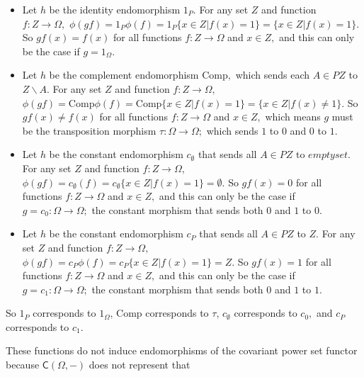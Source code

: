 \documentclass[main.tex]{subfiles}
\begin{document}
	\begin{itemize}
		\item Let $ h $ be the identity endomorphism $ 1_P $. For any
			set $ Z $ and function $ f: Z \to \Omega, $ $ \phi(gf)
			= 1_P\phi(f) = 1_P\{x \in Z | f(x) = 1\} = \{x \in Z |
			f(x) = 1\}. $ So $ gf(x) = f(x) $ for all functions $
			f: Z \to \Omega $ and $ x \in Z, $ and this can only be
			the case if $ g = 1_\Omega. $
		\item Let $ h $ be the complement endomorphism $ \mathrm{Comp},
			$ which sends each $ A\in PZ $ to $ Z\backslash A $.
			For any set $ Z $ and function $ f: Z \to \Omega, $ $
			\phi(gf) = \mathrm{Comp}\phi(f) = \mathrm{Comp}\{x \in
			Z | f(x) = 1\} = \{x \in Z | f(x) \neq 1\}. $ So $
			gf(x) \neq f(x) $ for all functions $ f: Z \to \Omega $
			and $ x \in Z, $ which means $ g $ must be the
			transposition morphism $ \tau: \Omega \to \Omega; $
			which sends $ 1 $ to $ 0 $ and $ 0 $ to $ 1 $.
		\item Let $ h $ be the constant endomorphism $ c_\emptyset $
			that sends all $ A\in PZ $ to $ emptyset. $ For any set
			$ Z $ and function $ f: Z \to \Omega, $ $ \phi(gf) =
			c_\emptyset(f) = c_\emptyset\{x \in Z | f(x) = 1\} =
			\emptyset. $ So $ gf(x) = 0 $ for all functions $ f: Z
			\to \Omega $ and $ x \in Z, $  and this can only be the
			case if $ g = c_0: \Omega \to \Omega; $ the constant
			morphism that sends both $ 0 $ and $ 1 $ to $ 0. $ 
		\item Let $ h $ be the constant endomorphism $ c_P $ that sends
			all $ A\in PZ $ to $ Z. $ For any set $ Z $ and
			function $ f: Z \to \Omega, $ $ \phi(gf) = c_P\phi(f) =
			c_P\{x \in Z | f(x) = 1\} = Z. $ So $ gf(x) = 1 $ for
			all functions $ f: Z \to \Omega $ and $ x \in Z, $  and
			this can only be the case if $ g = c_1: \Omega \to
			\Omega; $ the constant morphism that sends both $ 0 $
			and $ 1 $ to $ 1. $
	\end{itemize}
	
	So $ 1_P $ corresponds to $ 1_\Omega $, $ \mathrm{Comp} $ corresponds
	to $ \tau $, $ c_\emptyset $ corresponds to $ c_0, $ and $ c_P $
	corresponds to $ c_1 $.
	
	These functions do not induce endomorphisms of the covariant power set
	functor because $ \mathsf{C}(\Omega, -) $ does not represent that
	
\end{document}
